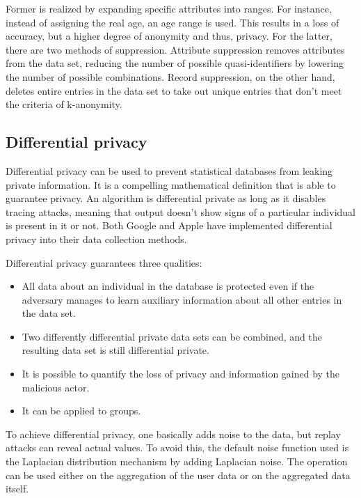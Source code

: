 Former is realized by expanding specific attributes into ranges. For instance, instead of assigning the real age, an age range is used. This results in a loss of accuracy, but a higher degree of anonymity and thus, privacy. For the latter, there are two methods of suppression. Attribute suppression removes attributes from the data set, reducing the number of possible quasi-identifiers by lowering the number of possible combinations. Record suppression, on the other hand, deletes entire entries in the data set to take out unique entries that don't meet the criteria of k-anonymity.

\subsection{Differential privacy}
Differential privacy can be used to prevent statistical databases from leaking private information. It is a compelling mathematical definition that is able to guarantee privacy. An algorithm is differential private as long as it disables tracing attacks, meaning that output doesn't show signs of a particular individual is present in it or not. Both Google and Apple have implemented differential privacy into their data collection methods.

Differential privacy guarantees three qualities:
\begin{itemize}
    \item All data about an individual in the database is protected even if the adversary manages to learn auxiliary information about all other entries in the data set.
    \item Two differently differential private data sets can be combined, and the resulting data set is still differential private.
    \item It is possible to quantify the loss of privacy and information gained by the malicious actor.
    \item It can be applied to groups.
\end{itemize}

To achieve differential privacy, one basically adds noise to the data, but replay attacks can reveal actual values. To avoid this, the default noise function used is the Laplacian distribution mechanism by adding Laplacian noise. The operation can be used either on the aggregation of the user data or on the aggregated data itself.

